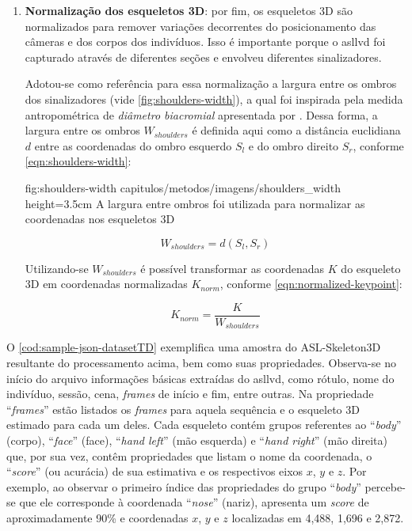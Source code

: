 \begin{enumerate}
    \item \textbf{Normalização dos esqueletos 3D}: por fim, os esqueletos 3D são normalizados para remover variações decorrentes do posicionamento das câmeras e dos corpos dos indivíduos. Isso é importante porque o \acrshort{asllvd} foi capturado através de diferentes seções e envolveu diferentes sinalizadores.

          Adotou-se como referência para essa normalização a largura entre os ombros dos sinalizadores (vide \autoref{fig:shoulders-width}), a qual foi inspirada pela medida antropométrica de \textit{diâmetro biacromial} apresentada por . Dessa forma, a largura entre os ombros \(W_{shoulders}\) é definida aqui como a distância euclidiana \(d\) entre as coordenadas do ombro esquerdo \(S_{l}\) e do ombro direito \(S_ {r}\), conforme \autoref{eqn:shoulders-width}:

          \figura
          {fig:shoulders-width} %
          {capitulos/metodos/imagens/shoulders_width} %
          {height=3.5cm} %
          {A largura entre ombros foi utilizada para normalizar as coordenadas nos esqueletos 3D} %
          {} %

          \begin{equation}
              \label{eqn:shoulders-width}
              W_{shoulders} = d\left(S_{l}, S_{r}\right)
          \end{equation}

          Utilizando-se \(W_{shoulders}\) é possível transformar as coordenadas \(K\) do esqueleto 3D em coordenadas normalizadas \(K_{norm}\), conforme \autoref{eqn:normalized-keypoint}:

          \begin{equation}
              \label{eqn:normalized-keypoint}
              K_{norm} = \frac{K}{W_{shoulders}}
          \end{equation}

\end{enumerate}


O \autoref{cod:sample-json-datasetTD} exemplifica uma amostra do ASL-Skeleton3D resultante do processamento acima, bem como suas propriedades. Observa-se no início do arquivo informações básicas extraídas do \acrshort{asllvd}, como rótulo, nome do indivíduo, sessão, cena, \textit{frames} de início e fim, entre outras. Na propriedade ``\textit{frames}'' estão listados os \textit{frames} para aquela sequência e o esqueleto 3D estimado para cada um deles. Cada esqueleto contém grupos referentes ao ``\textit{body}'' (corpo), ``\textit{face}'' (face), ``\textit{hand left}'' (mão esquerda) e ``\textit{hand right}'' (mão direita) que, por sua vez, contêm propriedades que listam o nome da coordenada, o ``\textit{score}'' (ou acurácia) de sua estimativa e os respectivos eixos \(x\), \(y\) e \(z\).
Por exemplo, ao observar o primeiro índice das propriedades do grupo ``\textit{body}'' percebe-se que ele corresponde à coordenada ``\textit{nose}'' (nariz), apresenta um \textit{score} de aproximadamente 90\% e coordenadas \(x\), \(y\) e \(z\) localizadas em 4,488, 1,696 e 2,872.

